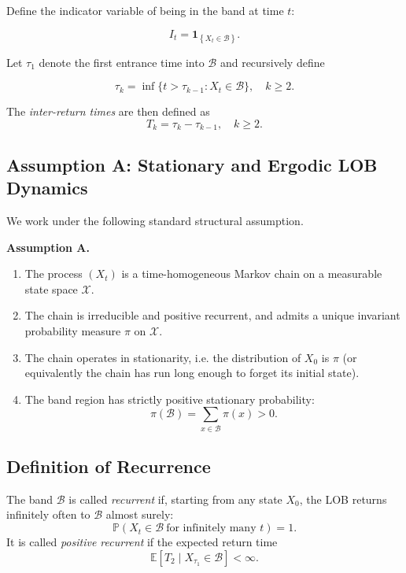 \documentclass[11pt]{article}
\begin{document}
Define the indicator variable of being in the band at time $t$:

\[
I_t = \mathbf{1}_{\left\{X_t \in \mathcal{B}\right\}}.
\]

Let $\tau_1$ denote the first entrance time into $\mathcal{B}$ and recursively define

\[
\tau_{k} = \inf\{t > \tau_{k-1} : X_t \in \mathcal{B}\}, \quad k \ge 2.
\]

The \emph{inter-return times} are then defined as
\[
T_k = \tau_k - \tau_{k-1}, \quad k \ge 2.
\]

\subsection{Assumption A: Stationary and Ergodic LOB Dynamics}

We work under the following standard structural assumption.

\vspace{2mm}
\noindent
\textbf{Assumption A.}
\begin{enumerate}
    \item The process $(X_t)$ is a time-homogeneous Markov chain on a measurable state space $\mathcal{X}$.

    \item The chain is irreducible and positive recurrent, and admits a unique invariant probability measure $\pi$ on $\mathcal{X}$.

    \item The chain operates in stationarity, i.e. the distribution of $X_0$ is $\pi$ (or equivalently the chain has run long enough to forget its initial state).

    \item The band region has strictly positive stationary probability:
    \[
    \pi(\mathcal{B}) = \sum_{x \in \mathcal{B}} \pi(x) > 0.
    \]
\end{enumerate}

\subsection{Definition of Recurrence}

\begin{definition}
    The band $\mathcal{B}$ is called \emph{recurrent} if, starting from any state $X_0$, the LOB returns infinitely often to $\mathcal{B}$ almost surely:
    \[
    \mathbb{P}\left( X_t \in \mathcal{B} \ \text{for infinitely many } t \right) = 1.
    \]
    It is called \emph{positive recurrent} if the expected return time
    \[
    \mathbb{E}[T_2 \mid X_{\tau_1} \in \mathcal{B}] < \infty.
    \]
\end{definition}
\end{document}
